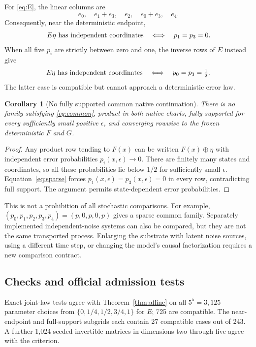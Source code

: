 \documentclass[11pt]{article}
\newtheorem{corollary}[theorem]{Corollary}
\theoremstyle{definition}\newtheorem{definition}[theorem]{Definition}
\theoremstyle{remark}\newtheorem{remark}[theorem]{Remark}
\begin{document}
For \eqref{eq:E}, the linear columns are
\begin{equation}
e_0,\quad e_1+e_3,\quad e_2,\quad e_0+e_3,\quad e_4.
\end{equation}
Consequently, near the deterministic endpoint,
\begin{equation}
E\eta\ \hbox{has independent coordinates}\quad\Longleftrightarrow\quad p_1=p_3=0.\label{eq:sparse}
\end{equation}
When all five $p_i$ are strictly between zero and one, the inverse rows of $E$ instead give
\begin{equation}
E\eta\ \hbox{has independent coordinates}\quad\Longleftrightarrow\quad p_0=p_3=\tfrac12.\label{eq:full}
\end{equation}
The latter case is compatible but cannot approach a deterministic error law.

\begin{corollary}[No fully supported common native continuation]\label{cor:nointerior}
There is no family satisfying \eqref{eq:common}, product in both native charts, fully supported for every sufficiently small positive $\epsilon$, and converging rowwise to the frozen deterministic $F$ and $G$.
\end{corollary}
\begin{proof}
Any product row tending to $F(x)$ can be written $F(x)\oplus\eta$ with independent error probabilities $p_i(x,\epsilon)\to0$. There are finitely many states and coordinates, so all these probabilities lie below $1/2$ for sufficiently small $\epsilon$. Equation~\eqref{eq:sparse} forces $p_1(x,\epsilon)=p_3(x,\epsilon)=0$ in every row, contradicting full support. The argument permits state-dependent error probabilities.
\end{proof}

This is not a prohibition of all stochastic comparisons. For example, $(p_0,p_1,p_2,p_3,p_4)=(p,0,p,0,p)$ gives a sparse common family. Separately implemented independent-noise systems can also be compared, but they are not the same transported process. Enlarging the substrate with latent noise sources, using a different time step, or changing the model's causal factorization requires a new comparison contract.

\subsection{Checks and official admission tests}
Exact joint-law tests agree with Theorem~\ref{thm:affine} on all $5^5=3{,}125$ parameter choices from $\{0,1/4,1/2,3/4,1\}$ for $E$; 725 are compatible. The near-endpoint and full-support subgrids each contain 27 compatible cases out of 243. A further 1,024 seeded invertible matrices in dimensions two through five agree with the criterion.
\end{document}

